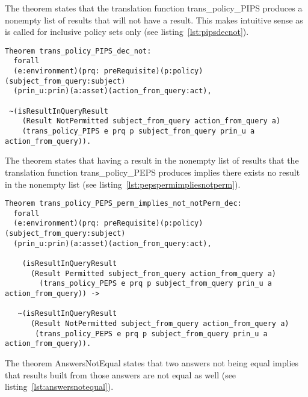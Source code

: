 The theorem  states that the translation function trans_policy_PIPS produces a nonempty list of results that will not have a  result. This makes intuitive sense as  is called for inclusive policy sets only (see listing~\ref{lst:pipsdecnot}).
\begin{lstlisting}
Theorem trans_policy_PIPS_dec_not:
  forall
  (e:environment)(prq: preRequisite)(p:policy)(subject_from_query:subject)
  (prin_u:prin)(a:asset)(action_from_query:act),

 ~(isResultInQueryResult 
    (Result NotPermitted subject_from_query action_from_query a)
    (trans_policy_PIPS e prq p subject_from_query prin_u a action_from_query)).

\end{lstlisting}

The theorem  states that having a  result in the nonempty list of results that the translation function trans_policy_PEPS produces implies there exists no  result in the nonempty list (see listing~\ref{lst:pepspermimpliesnotperm}).

\begin{lstlisting}
Theorem trans_policy_PEPS_perm_implies_not_notPerm_dec:
  forall
  (e:environment)(prq: preRequisite)(p:policy)(subject_from_query:subject)
  (prin_u:prin)(a:asset)(action_from_query:act),

    (isResultInQueryResult 
      (Result Permitted subject_from_query action_from_query a)
        (trans_policy_PEPS e prq p subject_from_query prin_u a action_from_query)) ->

   ~(isResultInQueryResult 
      (Result NotPermitted subject_from_query action_from_query a)
       (trans_policy_PEPS e prq p subject_from_query prin_u a action_from_query)).

\end{lstlisting}
The theorem AnswersNotEqual states that two answers not being equal implies that results built from those answers are not equal as well (see listing~\ref{lst:answersnotequal}).

